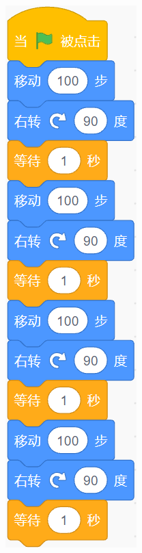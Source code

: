 \documentclass[10pt, a4paper]{article}
\begin{document}
\begin{enumerate}
\begin{figure}[htbp]
\begin{minipage}[t]{.13\textwidth}
                \includegraphics[width=.6\textwidth]{13.png}

\end{minipage}
\end{figure}
\end{enumerate}
\end{document}
